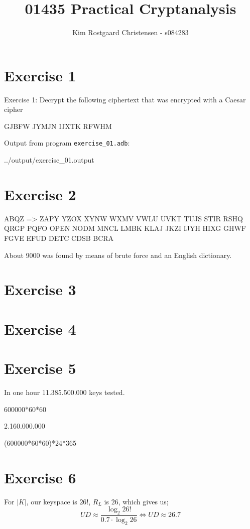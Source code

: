 \documentclass[10pt,a4paper]{article}
\title{01435 Practical Cryptanalysis}
\author{Kim Rostgaard Christensen - s084283}
\def\Code#1{\texttt{#1}}
\begin{document}
\maketitle

\section*{Exercise 1}
Exercise 1: Decrypt the following ciphertext that was encrypted with a Caesar cipher\\

\begin{center}
GJBFW JYMJN IJXTK RFWHM
\end{center}
Output from program \Code{exercise\_01.adb}:

 {../output/exercise_01.output}

\section*{Exercise 2}

ABQZ => ZAPY YZOX XYNW WXMV VWLU UVKT TUJS STIR RSHQ QRGP PQFO OPEN NODM MNCL LMBK KLAJ JKZI IJYH HIXG GHWF FGVE EFUD DETC CDSB BCRA

About 9000 was found by means of brute force and an English dictionary.

\section*{Exercise 3}
\section*{Exercise 4}
\section*{Exercise 5}
In one hour 11.385.500.000 keys tested.

600000*60*60

2.160.000.000

(600000*60*60)*24*365



\section*{Exercise 6}
For $|K|$, our keyspace is $26!$, $R_L$ is $26$, which gives us;
\begin{equation}
UD \approx \frac{\log_2{26!}}{0.7 \cdot \log_2{26}} \Leftrightarrow UD \approx 26.7
\end{equation}
\end{document}
